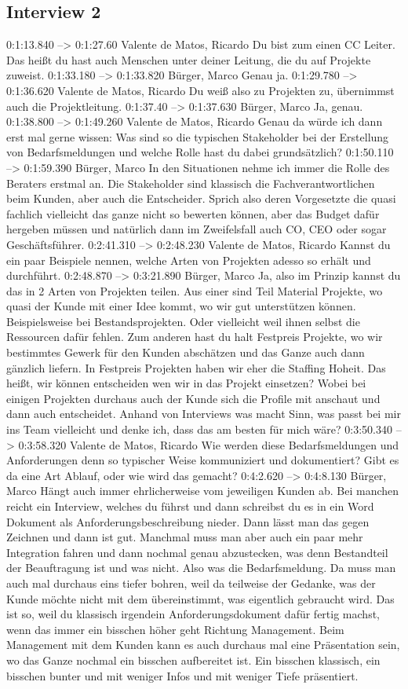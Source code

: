 \subsection{Interview 2}
0:1:13.840 --> 0:1:27.60
Valente de Matos, Ricardo
Du bist zum einen CC Leiter. Das heißt du hast auch Menschen unter deiner Leitung, die du auf Projekte zuweist.
0:1:33.180 --> 0:1:33.820
Bürger, Marco
Genau ja.
0:1:29.780 --> 0:1:36.620
Valente de Matos, Ricardo
Du weiß also zu Projekten zu, übernimmst auch die Projektleitung.
0:1:37.40 --> 0:1:37.630
Bürger, Marco
Ja, genau.
0:1:38.800 --> 0:1:49.260
Valente de Matos, Ricardo
Genau da würde ich dann erst mal gerne wissen: Was sind so die typischen Stakeholder bei der Erstellung von Bedarfsmeldungen und welche Rolle hast du dabei grundsätzlich?
0:1:50.110 --> 0:1:59.390
Bürger, Marco
In den Situationen nehme ich immer die Rolle des Beraters erstmal an. Die Stakeholder sind klassisch die Fachverantwortlichen beim Kunden, aber auch die Entscheider. Sprich also deren Vorgesetzte die quasi fachlich vielleicht das ganze nicht so bewerten können, aber das Budget dafür hergeben müssen und natürlich dann im Zweifelsfall auch CO, CEO oder sogar Geschäftsführer.
0:2:41.310 --> 0:2:48.230
Valente de Matos, Ricardo
Kannst du ein paar Beispiele nennen, welche Arten von Projekten adesso so erhält und durchführt.
0:2:48.870 --> 0:3:21.890
Bürger, Marco
Ja, also im Prinzip kannst du das in 2 Arten von Projekten teilen. Aus einer sind Teil Material Projekte, wo quasi der Kunde mit einer Idee kommt, wo wir gut unterstützen können. Beispielsweise bei Bestandsprojekten. Oder vielleicht weil ihnen selbst die Ressourcen dafür fehlen. Zum anderen hast du halt Festpreis Projekte, wo wir bestimmtes Gewerk für den Kunden abschätzen und das Ganze auch dann gänzlich liefern. In Festpreis Projekten haben wir eher die Staffing Hoheit. Das heißt, wir können entscheiden wen wir in das Projekt einsetzen? Wobei bei einigen Projekten durchaus auch der Kunde sich die Profile mit anschaut und dann auch entscheidet. Anhand von Interviews was macht Sinn, was passt bei mir ins Team vielleicht und denke ich, dass das am besten für mich wäre?
0:3:50.340 --> 0:3:58.320
Valente de Matos, Ricardo
Wie werden diese Bedarfsmeldungen und Anforderungen denn so typischer Weise kommuniziert und dokumentiert? Gibt es da eine Art Ablauf, oder wie wird das gemacht?
0:4:2.620 --> 0:4:8.130
Bürger, Marco
Hängt auch immer ehrlicherweise vom jeweiligen Kunden ab. Bei manchen reicht ein Interview, welches du führst und dann schreibst du es in ein Word Dokument als Anforderungsbeschreibung nieder. Dann lässt man das gegen Zeichnen und dann ist gut. Manchmal muss man aber auch ein paar mehr Integration fahren und dann nochmal genau abzustecken, was denn Bestandteil der Beauftragung ist und was nicht. Also was die Bedarfsmeldung. Da muss man auch mal durchaus eins tiefer bohren, weil da teilweise der Gedanke, was der Kunde möchte nicht mit dem übereinstimmt, was eigentlich gebraucht wird. Das ist so, weil du klassisch irgendein Anforderungsdokument dafür fertig machst, wenn das immer ein bisschen höher geht Richtung Management. Beim Management mit dem Kunden kann es auch durchaus mal eine Präsentation sein, wo das Ganze nochmal ein bisschen aufbereitet ist. Ein bisschen klassisch, ein bisschen bunter und mit weniger Infos und mit weniger Tiefe präsentiert.
